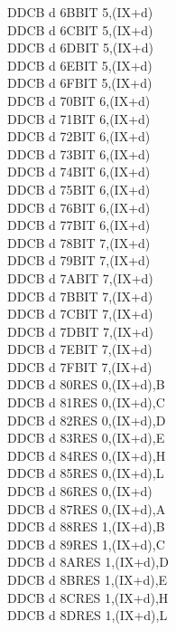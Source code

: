 \begin{multicols}{3}
{\begin{tabbing}
    DDCB d 6B\>BIT 5,(IX+d)\UNDOC\\
    DDCB d 6C\>BIT 5,(IX+d)\UNDOC\\
    DDCB d 6D\>BIT 5,(IX+d)\UNDOC\\
    DDCB d 6E\>BIT 5,(IX+d)\\
    DDCB d 6F\>BIT 5,(IX+d)\UNDOC\\
    DDCB d 70\>BIT 6,(IX+d)\UNDOC\\
    DDCB d 71\>BIT 6,(IX+d)\UNDOC\\
    DDCB d 72\>BIT 6,(IX+d)\UNDOC\\
    DDCB d 73\>BIT 6,(IX+d)\UNDOC\\
    DDCB d 74\>BIT 6,(IX+d)\UNDOC\\
    DDCB d 75\>BIT 6,(IX+d)\UNDOC\\
    DDCB d 76\>BIT 6,(IX+d)\\
    DDCB d 77\>BIT 6,(IX+d)\UNDOC\\
    DDCB d 78\>BIT 7,(IX+d)\UNDOC\\
    DDCB d 79\>BIT 7,(IX+d)\UNDOC\\
    DDCB d 7A\>BIT 7,(IX+d)\UNDOC\\
    DDCB d 7B\>BIT 7,(IX+d)\UNDOC\\
    DDCB d 7C\>BIT 7,(IX+d)\UNDOC\\
    DDCB d 7D\>BIT 7,(IX+d)\UNDOC\\
    DDCB d 7E\>BIT 7,(IX+d)\\
    DDCB d 7F\>BIT 7,(IX+d)\UNDOC\\
    DDCB d 80\>RES 0,(IX+d),B\UNDOC\\
    DDCB d 81\>RES 0,(IX+d),C\UNDOC\\
    DDCB d 82\>RES 0,(IX+d),D\UNDOC\\
    DDCB d 83\>RES 0,(IX+d),E\UNDOC\\
    DDCB d 84\>RES 0,(IX+d),H\UNDOC\\
    DDCB d 85\>RES 0,(IX+d),L\UNDOC\\
    DDCB d 86\>RES 0,(IX+d)\\
    DDCB d 87\>RES 0,(IX+d),A\UNDOC\\
    DDCB d 88\>RES 1,(IX+d),B\UNDOC\\
    DDCB d 89\>RES 1,(IX+d),C\UNDOC\\
    DDCB d 8A\>RES 1,(IX+d),D\UNDOC\\
    DDCB d 8B\>RES 1,(IX+d),E\UNDOC\\
    DDCB d 8C\>RES 1,(IX+d),H\UNDOC\\
    DDCB d 8D\>RES 1,(IX+d),L\UNDOC\\

\end{tabbing}}
\end{multicols}
